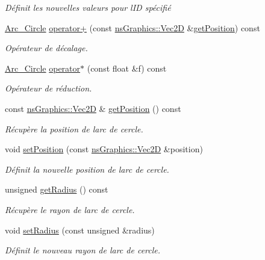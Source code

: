 \begin{DoxyCompactItemize}
\begin{DoxyCompactList}\small\item\em Définit les nouvelles valeurs pour l\textquotesingle{}ID spécifié \end{DoxyCompactList}\item 
\hyperlink{classns_shape_1_1_arc___circle}{Arc\+\_\+\+Circle} \hyperlink{classns_shape_1_1_arc___circle_ac29fef537e801cbf80c148452772c770}{operator+} (const \hyperlink{classns_graphics_1_1_vec2_d}{ns\+Graphics\+::\+Vec2D} \&\hyperlink{classns_shape_1_1_arc___circle_a931e29f1d186676dd84e376dc6576254}{get\+Position}) const
\begin{DoxyCompactList}\small\item\em Opérateur de décalage. \end{DoxyCompactList}\item 
\hyperlink{classns_shape_1_1_arc___circle}{Arc\+\_\+\+Circle} \hyperlink{classns_shape_1_1_arc___circle_aa048e6ac6e09a351d78a2f9f6ebe0430}{operator$\ast$} (const float \&f) const
\begin{DoxyCompactList}\small\item\em Opérateur de réduction. \end{DoxyCompactList}\item 
const \hyperlink{classns_graphics_1_1_vec2_d}{ns\+Graphics\+::\+Vec2D} \& \hyperlink{classns_shape_1_1_arc___circle_a931e29f1d186676dd84e376dc6576254}{get\+Position} () const
\begin{DoxyCompactList}\small\item\em Récupère la position de l\textquotesingle{}arc de cercle. \end{DoxyCompactList}\item 
void \hyperlink{classns_shape_1_1_arc___circle_a52fa998838188e80ff97f96ad514cfe6}{set\+Position} (const \hyperlink{classns_graphics_1_1_vec2_d}{ns\+Graphics\+::\+Vec2D} \&position)
\begin{DoxyCompactList}\small\item\em Définit la nouvelle position de l\textquotesingle{}arc de cercle. \end{DoxyCompactList}\item 
unsigned \hyperlink{classns_shape_1_1_arc___circle_a7fbd0dc94a0a3de9fcb9352156e50d3b}{get\+Radius} () const
\begin{DoxyCompactList}\small\item\em Récupère le rayon de l\textquotesingle{}arc de cercle. \end{DoxyCompactList}\item 
void \hyperlink{classns_shape_1_1_arc___circle_ac0dac107441139a53881faa0be110eaa}{set\+Radius} (const unsigned \&radius)
\begin{DoxyCompactList}\small\item\em Définit le nouveau rayon de l\textquotesingle{}arc de cercle. \end{DoxyCompactList}\end{DoxyCompactItemize}
